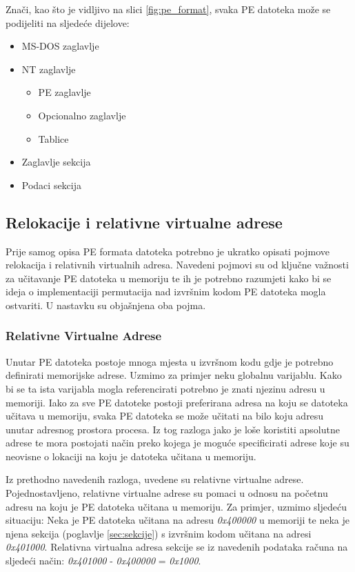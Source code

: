 \documentclass[times, utf8, diplomski, numeric]{fer}
\begin{document}

Znači, kao što je vidljivo na slici \ref{fig:pe_format}, svaka PE
datoteka može se podijeliti na sljedeće dijelove:

\begin{itemize}
\item MS-DOS zaglavlje
\item NT zaglavlje
	\begin{itemize}
	\item PE zaglavlje
	\item Opcionalno zaglavlje
	\item Tablice
	\end{itemize}
\item Zaglavlje sekcija
\item Podaci sekcija
\end{itemize}


\subsection{Relokacije i relativne virtualne adrese}

Prije samog opisa PE formata datoteka potrebno je ukratko
opisati pojmove relokacija i relativnih virtualnih adresa.
Navedeni pojmovi su od ključne važnosti za učitavanje PE datoteka
u memoriju te ih je potrebno razumjeti kako bi se ideja o
implementaciji permutacija nad izvršnim kodom PE datoteka mogla
ostvariti. U nastavku su objašnjena oba pojma.

\subsubsection{Relativne Virtualne Adrese}
\label{sct:rva}

Unutar PE datoteka postoje mnoga mjesta u izvršnom kodu gdje je
potrebno definirati memorijske adrese. Uzmimo za primjer neku
globalnu varijablu. Kako bi se ta ista varijabla mogla
referencirati potrebno je znati njezinu adresu u memoriji. Iako
za sve PE datoteke postoji preferirana adresa na koju se datoteka
učitava u memoriju, svaka PE datoteka se može učitati na bilo
koju adresu unutar adresnog prostora procesa. Iz tog razloga jako
je loše koristiti apsolutne adrese te mora postojati način preko
kojega je moguće specificirati adrese koje su neovisne o lokaciji
na koju je datoteka učitana u memoriju.

Iz prethodno navedenih razloga, uvedene su relativne virtualne
adrese. Pojednostavljeno, relativne virtualne adrese su pomaci u
odnosu na početnu adresu na koju je PE datoteka učitana u
memoriju. Za primjer, uzmimo sljedeću situaciju: Neka je PE
datoteka učitana na adresu \emph{0x400000} u memoriji te neka je
njena sekcija (poglavlje \ref{sec:sekcije}) s izvršnim kodom učitana na
adresi \emph{0x401000}. Relativna virtualna adresa sekcije se iz
navedenih podataka računa na sljedeći način:					%
\emph{0x401000} - \emph{0x400000} = \emph{0x1000}.
\end{document}
